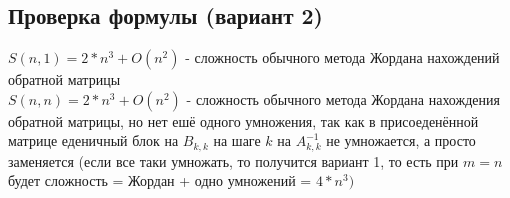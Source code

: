 \documentclass[a4paper,12pt]{article}
\begin{document}
\subsection{Проверка формулы (вариант 2)}
$S(n, 1) = 2*n^{3} + O(n^{2})$ - сложность обычного метода Жордана нахождений обратной матрицы\\
$S(n, n) = 2*n^{3} + O(n^{2})$ - сложность обычного метода Жордана нахождения обратной матрицы,
но нет ешё одного умножения, так как в присоеденённой матрице еденичный блок на 
$B_{k, k}$ на шаге $k$ на $A_{k,k}^{-1}$ не умножается, а просто заменяется
(если все таки умножать, то получится вариант 1, то есть при $m=n$ будет
сложность = Жордан + одно умножений = $4*n^{3})$
\end{document}

